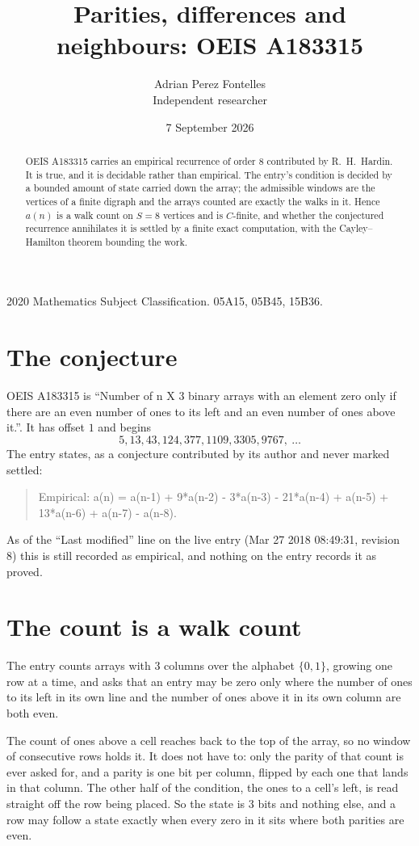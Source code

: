 \documentclass[11pt,a4paper]{article}
\title{Parities, differences and neighbours: OEIS A183315}
\author{Adrian Perez Fontelles\\ \small Independent researcher}
\date{7 September 2026}
\theoremstyle{plain}
\theoremstyle{definition}
\begin{document}
\maketitle

\begin{abstract}
OEIS A183315 carries an empirical recurrence of order $8$ contributed by R.~H.~Hardin. It is
true, and it is decidable rather than empirical. The entry's condition is decided by a bounded amount of state carried down the array; the
admissible windows are the vertices of a finite digraph and the arrays counted are exactly the
walks in it. Hence $a(n)$ is a walk count on $S=8$ vertices and is $C$-finite, and whether the
conjectured recurrence annihilates it is settled by a finite exact computation, with the
Cayley--Hamilton theorem bounding the work.
\end{abstract}

\noindent\small 2020 Mathematics Subject Classification. 05A15, 05B45, 15B36.\normalsize

\section{The conjecture}

OEIS A183315 is ``Number of n X 3 binary arrays with an element zero only if there are an even number of ones to its left and an even number of ones above it.''. It has offset $1$ and begins
\[
5, 13, 43, 124, 377, 1109, 3305, 9767,\ \dots
\]
The entry states, as a conjecture contributed by its author and never marked settled:
\begin{quote}
Empirical: a(n) = a(n-1) + 9*a(n-2) - 3*a(n-3) - 21*a(n-4) + a(n-5) + 13*a(n-6) + a(n-7) - a(n-8).
\end{quote}
As of the ``Last modified'' line on the live entry (Mar 27 2018 08:49:31, revision 8) this is still
recorded as empirical, and nothing on the entry records it as proved.

\section{The count is a walk count}

The entry counts arrays with $3$ columns over the alphabet $\{0,1\}$, growing one row at a time, and asks that an entry may be zero only where the number of ones to its left in its own line and the number of ones above it in its own column are both even.

The count of ones above a cell reaches back to the top of the array, so no window of consecutive rows holds it. It does not have to: only the parity of that count is ever asked for, and a parity is one bit per column, flipped by each one that lands in that column. The other half of the condition, the ones to a cell's left, is read straight off the row being placed. So the state is $3$ bits and nothing else, and a row may follow a state exactly when every zero in it sits where both parities are even.
\end{document}
